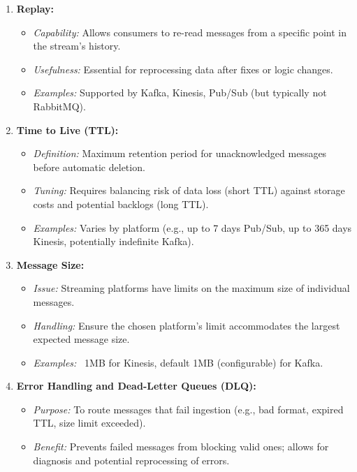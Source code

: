 \begin{enumerate}
    \item \textbf{Replay:}
    \begin{itemize}[label=\textbullet]
        \item \textit{Capability:} Allows consumers to re-read messages from a specific point in the stream's history.
        \item \textit{Usefulness:} Essential for reprocessing data after fixes or logic changes.
        \item \textit{Examples:} Supported by Kafka, Kinesis, Pub/Sub (but typically not RabbitMQ).
    \end{itemize}

    \item \textbf{Time to Live (TTL):}
    \begin{itemize}[label=\textbullet]
        \item \textit{Definition:} Maximum retention period for unacknowledged messages before automatic deletion.
        \item \textit{Tuning:} Requires balancing risk of data loss (short TTL) against storage costs and potential backlogs (long TTL).
        \item \textit{Examples:} Varies by platform (e.g., up to 7 days Pub/Sub, up to 365 days Kinesis, potentially indefinite Kafka).
    \end{itemize}

    \item \textbf{Message Size:}
    \begin{itemize}[label=\textbullet]
        \item \textit{Issue:} Streaming platforms have limits on the maximum size of individual messages.
        \item \textit{Handling:} Ensure the chosen platform's limit accommodates the largest expected message size.
        \item \textit{Examples:} ~1MB for Kinesis, default 1MB (configurable) for Kafka.
    \end{itemize}

    \item \textbf{Error Handling and Dead-Letter Queues (DLQ):}
    \begin{itemize}[label=\textbullet]
        \item \textit{Purpose:} To route messages that fail ingestion (e.g., bad format, expired TTL, size limit exceeded).
        \item \textit{Benefit:} Prevents failed messages from blocking valid ones; allows for diagnosis and potential reprocessing of errors.
    \end{itemize}


\end{enumerate}
